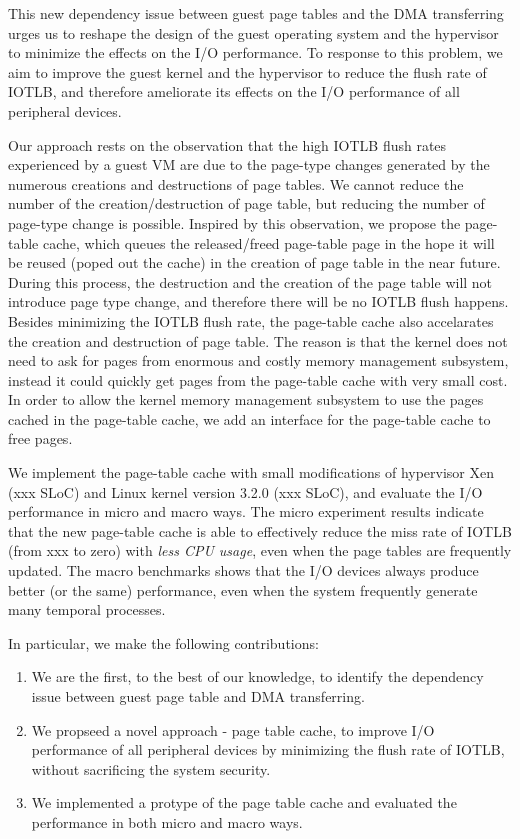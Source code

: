 
This new dependency issue between guest page tables and the DMA transferring urges us to reshape the design of the guest operating system and the hypervisor to minimize the effects on the I/O performance. 
To response to this problem, we aim to improve the guest kernel and the hypervisor to reduce the flush rate of IOTLB, and therefore ameliorate its effects on the I/O performance of all peripheral devices.

Our approach rests on the observation that the high IOTLB flush rates experienced by a guest VM 
are due to the page-type changes generated by the numerous creations and destructions of page tables. 
We cannot reduce the number of the creation/destruction of page table, but reducing the number of page-type change is possible.
Inspired by this observation, we propose the page-table cache, which queues the released/freed page-table page in the hope 
it will be reused (poped out the cache) in the creation of page table in the near future. 
During this process, the destruction and the creation of the page table will not introduce page type change, and therefore there will be no IOTLB flush happens.
Besides minimizing the IOTLB flush rate, the page-table cache also accelarates the creation and destruction of page table.
The reason is that the kernel does not need to ask for pages from enormous and costly memory management subsystem, instead it could quickly get pages from the page-table cache with very small cost. 
In order to allow the kernel memory management subsystem to use the pages cached in the page-table cache, we add an interface for the page-table cache to free pages.

We implement the page-table cache with small modifications of hypervisor Xen (xxx SLoC)  and Linux kernel version 3.2.0 (xxx SLoC), and evaluate the I/O performance in micro and macro ways. 
The micro experiment results indicate that the new page-table cache is able to effectively reduce the miss rate of IOTLB (from xxx to zero) with \emph{less CPU usage}, even when the page tables are frequently updated. 
The macro benchmarks shows that the I/O devices always produce better (or the same) performance, even when the system frequently generate many temporal processes.


In particular, we make the following contributions:
\begin{enumerate}
\item We are the first, to the best of our knowledge, to identify the dependency issue between guest page table and DMA transferring. 
\item We propseed a novel approach - page table cache, to improve I/O performance of all peripheral devices by minimizing the flush rate of IOTLB, without sacrificing the system security.
\item We implemented a protype of the page table cache and evaluated the performance in both micro and macro ways.
\end{enumerate}

